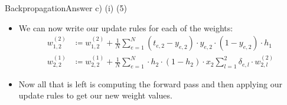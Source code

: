 \documentclass[t]{beamer}
\begin{document}
\begin{frame}{Backpropagation}{Answer c) (i) (5)}
    \begin{itemize}
        \item We can now write our update rules for each of the weights:
              \begin{align*}
                  w_{1,2}^{(2)} & \coloneqq w_{1,2}^{(2)} + \frac{1}{N} \sum_{e=1}^{N} (t_{e,2}-y_{e,2})\cdot y_{e,2}\cdot\left(1-y_{e,2}\right) \cdot h_1             \\
                  w_{2,2}^{(1)} & \coloneqq w_{2,2}^{(1)} + \frac{1}{N} \sum_{e=1}^{N} \cdot h_2\cdot(1 - h_2)\cdot x_2 \sum_{l=1}^{2} \delta_{e,l}\cdot w^{(2)}_{2,l}
              \end{align*}
        \item Now all that is left is computing the forward pass and then
              applying our update rules to get our new weight values.
    \end{itemize}
\end{frame}
\end{document}

